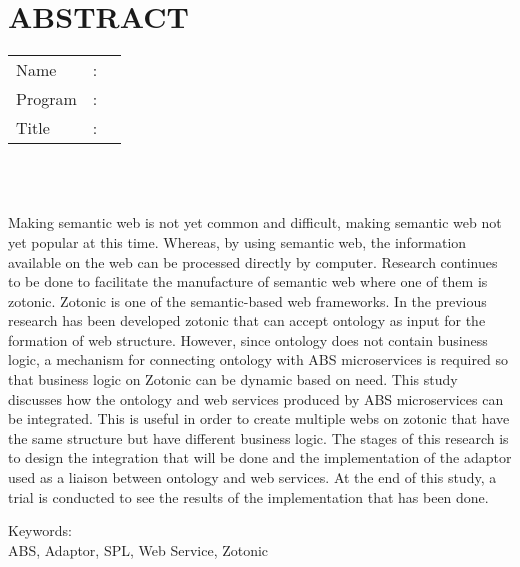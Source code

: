 %
%
%

	\chapter*{ABSTRACT}

\vspace*{0.2cm}

\noindent \begin{tabular}{l l p{11.0cm}}
	Name&: & \penulis \\
	Program&: & \programEng \\
	Title&: & \judulInggris \\
\end{tabular} \\ 

\vspace*{0.5cm}

\noindent 
\\ Making semantic web is not yet common and difficult, making semantic web not yet popular at this time. Whereas, by using semantic web, the information available on the web can be processed directly by computer. Research continues to be done to facilitate the manufacture of semantic web where one of them is zotonic. Zotonic is one of the semantic-based web frameworks. In the previous research has been developed zotonic that can accept ontology as input for the formation of web structure. However, since ontology does not contain business logic, a mechanism for connecting ontology with ABS microservices is required so that business logic on Zotonic can be dynamic based on need. This study discusses how the ontology and web services produced by ABS microservices can be integrated. This is useful in order to create multiple webs on zotonic that have the same structure but have different business logic. The stages of this research is to design the integration that will be done and the implementation of the adaptor used as a liaison between ontology and web services. At the end of this study, a trial is conducted to see the results of the implementation that has been done.

\vspace*{0.2cm}

\noindent Keywords: \\ 
\noindent ABS, Adaptor, SPL, Web Service, Zotonic\\

\newpage